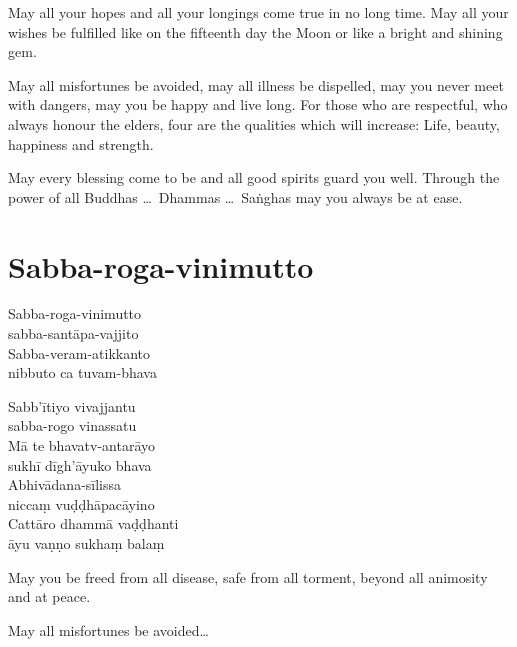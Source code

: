 May all your hopes and all your longings come true in no long time. May all your
wishes be fulfilled like on the fifteenth day the Moon or like a bright and
shining gem.


May all misfortunes be avoided, may all illness be dispelled, may you never meet
with dangers, may you be happy and live long. For those who are respectful, who
always honour the elders, four are the qualities which will increase: Life,
beauty, happiness and strength.


May every blessing come to be and all good spirits guard you well. Through the
power of all Buddhas \ldots\ Dhammas \ldots\ Saṅghas may you always be at ease.

\section{Sabba-roga-vinimutto}



\bigskip

\begin{paritta}
  Sabba-roga-vinimutto\\\vin sabba-santāpa-vajjito\\
  Sabba-veram-atikkanto\\\vin nibbuto ca tuvam-bhava

  Sabb'ītiyo vivajjantu\\\vin sabba-rogo vinassatu\\
  Mā te bhavatv-antarāyo\\\vin sukhī dīgh'āyuko bhava\\
  Abhivādana-sīlissa\\\vin niccaṃ vuḍḍhāpacāyino\\
  Cattāro dhammā vaḍḍhanti\\\vin āyu vaṇṇo sukhaṃ balaṃ
\end{paritta}


\bigskip

\begin{english}
May you be freed from all disease, safe from all torment, beyond all animosity
and at peace.

May all misfortunes be avoided\ldots
\end{english}

